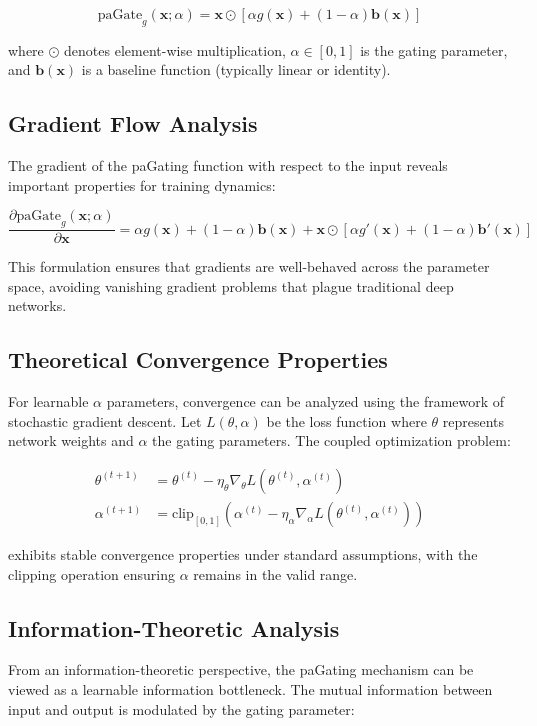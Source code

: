 \documentclass[lettersize,journal]{IEEEtran}
\begin{document}
\begin{equation}
\text{paGate}_g(\mathbf{x}; \alpha) = \mathbf{x} \odot [\alpha g(\mathbf{x}) + (1-\alpha) \mathbf{b}(\mathbf{x})]
\label{eq:pagating_general}
\end{equation}

where $\odot$ denotes element-wise multiplication, $\alpha \in [0,1]$ is the gating parameter, and $\mathbf{b}(\mathbf{x})$ is a baseline function (typically linear or identity).

\subsection{Gradient Flow Analysis}
The gradient of the paGating function with respect to the input reveals important properties for training dynamics:

\begin{equation}
\frac{\partial \text{paGate}_g(\mathbf{x}; \alpha)}{\partial \mathbf{x}} = \alpha g(\mathbf{x}) + (1-\alpha) \mathbf{b}(\mathbf{x}) + \mathbf{x} \odot [\alpha g'(\mathbf{x}) + (1-\alpha) \mathbf{b}'(\mathbf{x})]
\end{equation}

This formulation ensures that gradients are well-behaved across the parameter space, avoiding vanishing gradient problems that plague traditional deep networks.

\subsection{Theoretical Convergence Properties}
For learnable $\alpha$ parameters, convergence can be analyzed using the framework of stochastic gradient descent. Let $L(\theta, \alpha)$ be the loss function where $\theta$ represents network weights and $\alpha$ the gating parameters. The coupled optimization problem:

\begin{align}
\theta^{(t+1)} &= \theta^{(t)} - \eta_\theta \nabla_\theta L(\theta^{(t)}, \alpha^{(t)}) \\
\alpha^{(t+1)} &= \text{clip}_{[0,1]}(\alpha^{(t)} - \eta_\alpha \nabla_\alpha L(\theta^{(t)}, \alpha^{(t)}))
\end{align}

exhibits stable convergence properties under standard assumptions, with the clipping operation ensuring $\alpha$ remains in the valid range.

\subsection{Information-Theoretic Analysis}
From an information-theoretic perspective, the paGating mechanism can be viewed as a learnable information bottleneck. The mutual information between input and output is modulated by the gating parameter:
\end{document}
